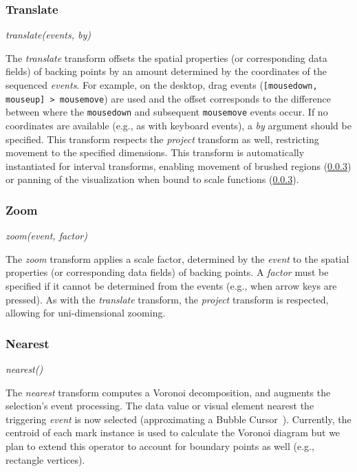 \subsubsection{Translate}

\centerline{\emph{translate(events, by)}}

The \emph{translate} transform offsets the spatial properties (or corresponding
data fields) of backing points by an amount determined by the coordinates of the
sequenced \emph{events}. For example, on the desktop, drag events
(\texttt{[mousedown, mouseup] > mousemove}) are used and the offset corresponds
to the difference between where the \texttt{mousedown} and subsequent
\texttt{mousemove} events occur. If no coordinates are available (e.g., as with
keyboard events), a \emph{by} argument should be specified. This transform
respects the \emph{project} transform as well, restricting movement to the
specified dimensions. This transform is automatically instantiated for interval
transforms, enabling movement of brushed regions (\cref{})
or panning of the visualization when bound to scale functions
(\cref{}).

\subsubsection{Zoom}

\centerline{\emph{zoom(event, factor)}}

The \emph{zoom} transform applies a scale factor, determined by the \emph{event}
to the spatial properties (or corresponding data fields) of backing points. A
\emph{factor} must be specified if it cannot be determined from the events
(e.g., when arrow keys are pressed). As with the \emph{translate} transform, the
\emph{project} transform is respected, allowing for uni-dimensional zooming.

\subsubsection{Nearest}

\centerline{\emph{nearest()}}

The \emph{nearest} transform computes a Voronoi decomposition, and augments the
selection's event processing. The data value or visual element nearest the
triggering \emph{event} is now selected (approximating a Bubble
Cursor~\cite{grossman:bubble}). Currently, the centroid of each mark instance is
used to calculate the Voronoi diagram but we plan to extend this operator to
account for boundary points as well (e.g., rectangle vertices).

